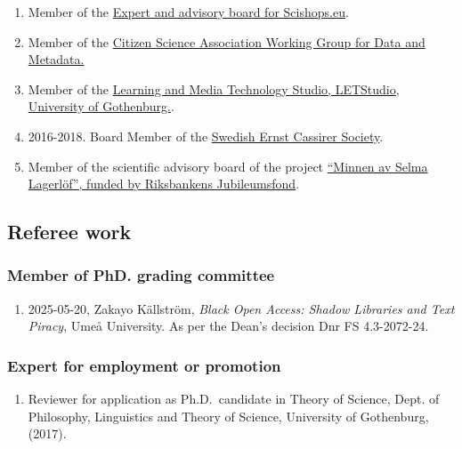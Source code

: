 \documentclass[
]{article}
\providecommand{\tightlist}{%
  \setlength{\itemsep}{0pt}\setlength{\parskip}{0pt}}
\begin{document}
\begin{enumerate}
\def\labelenumi{\arabic{enumi}.}
\tightlist
\item
  Member of the
  \href{https://www.scishops.eu/export-and-advisory-board/\#16}{Expert
  and advisory board for Scishops.eu}.
\item
  Member of the
  \href{https://citizenscienceassociation.org/overview/steering-committees/\#metadata}{Citizen
  Science Association Working Group for Data and Metadata.}
\item
  Member of the
  \href{http://letstudio.gu.se/members/christopher-kullenberg}{Learning
  and Media Technology Studio, LETStudio, University of Gothenburg.}.
\item
  2016-2018. Board Member of the
  \href{http://cassirer.se/sallskapet/styrelse/}{Swedish Ernst Cassirer
  Society}.
\item
  Member of the scientific advisory board of the project
  \href{http://anslag.rj.se/sv/anslag/52553}{``Minnen av Selma
  Lagerlöf'', funded by Riksbankens Jubileumsfond}.
\end{enumerate}

\hypertarget{referee-work}{%
\subsection{Referee work}\label{referee-work}}

\hypertarget{member-of-phd.-grading-committee}{%
\subsubsection{Member of PhD. grading
committee}\label{member-of-phd.-grading-committee}}

\begin{enumerate}
\def\labelenumi{\arabic{enumi}.}
\tightlist
\item
  2025-05-20, Zakayo Källström, \emph{Black Open Access: Shadow
  Libraries and Text Piracy}, Umeå University. As per the Dean's
  decision Dnr FS 4.3-2072-24.
\end{enumerate}

\hypertarget{expert-for-employment-or-promotion}{%
\subsubsection{Expert for employment or
promotion}\label{expert-for-employment-or-promotion}}

\begin{enumerate}
\def\labelenumi{\arabic{enumi}.}
\tightlist
\item
  Reviewer for application as Ph.D.~candidate in Theory of Science,
  Dept. of Philosophy, Linguistics and Theory of Science, University of
  Gothenburg, (2017).
\end{enumerate}
\end{document}
